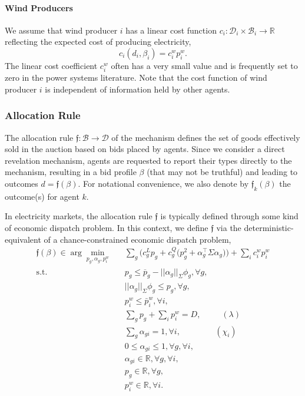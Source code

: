 \documentclass{article}
\begin{document}
\paragraph{Wind Producers} We assume that wind producer $i$ has a linear cost function $c_i: \mathcal{D}_i \times \mathcal{B}_i \rightarrow \mathbb{R}$ reflecting the expected cost of producing electricity,
\begin{equation*}
c_i(d_i, \beta_i) = c_i^w p_i^w.
\end{equation*}
The linear cost coefficient $c_i^w$ often has a very small value and is frequently set to zero in the power systems literature. Note that the cost function of wind producer $i$ is independent of information held by other agents.

\subsubsection{Allocation Rule}

The allocation rule $\mathfrak{f}: \mathcal{B} \rightarrow \mathcal{D}$ of the mechanism defines the set of goods effectively sold in the auction based on bids placed by agents. Since we consider a direct revelation mechanism, agents are requested to report their types directly to the mechanism, resulting in a bid profile $\beta$ (that may not be truthful) and leading to outcomes $d = \mathfrak{f}(\beta)$. For notational convenience, we also denote by $\mathfrak{f}_k(\beta)$ the outcome(s) for agent $k$.

In electricity markets, the allocation rule $\mathfrak{f}$ is typically defined through some kind of economic dispatch problem. In this context, we define $\mathfrak{f}$ via the deterministic-equivalent of a chance-constrained economic dispatch problem,
\begin{align}
\mathfrak{f}(\beta) \in \arg \underset{p_g, \alpha_g,p_i^w}{\min} \hspace{10pt} & \sum_g \Big(c_g^L p_g + c_g^Q \big(p_g^2 + \alpha_g^\top \Sigma \alpha_g\big)\Big) + \sum_i c_i^w p_i^w \\
\mbox{s.t. } & p_g \le \overline{p}_g - ||\alpha_g||_{\Sigma} \phi_g,\forall g,\\
& ||\alpha_g||_{\Sigma} \phi_g \le p_g,\forall g,\\
& p_i^w \le \bar{p}_i^w, \forall i,\\
& \sum_g p_g + \sum_i p_i^w = D, \hspace{30pt} (\lambda)\\
& \sum_g \alpha_{gi} = 1, \forall i, \hspace{50pt} (\chi_i)\\
& 0 \le \alpha_{gi} \le 1, \forall g, \forall i,\\
& \alpha_{gi} \in \mathbb{R}, \forall g, \forall i,\\
& p_g \in \mathbb{R}, \forall g,\\
& p_i^w \in \mathbb{R}, \forall i.
\end{align}
\end{document}
